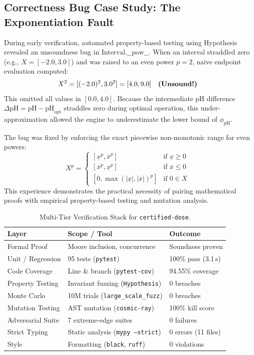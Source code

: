 \documentclass[10pt,twocolumn,letterpaper]{article}
\theoremstyle{definition}
\newcommand{\pHopt}{\text{pH}_{\text{opt}}}
\newcommand{\phipH}{\phi_{\text{pH}}}
\begin{document}
\subsection{Correctness Bug Case Study: The Exponentiation Fault}
During early verification, automated property-based testing using Hypothesis~\cite{maciver2019hypothesis} revealed an unsoundness bug in $\text{Interval}.\_\_\text{pow}\_\_$. When an interval straddled zero (e.g., $X = [-2.0, 3.0]$) and was raised to an even power $p=2$, naive endpoint evaluation computed:
\begin{equation}
X^2 = [(-2.0)^2, 3.0^2] = [4.0, 9.0] \quad \text{\textbf{(Unsound!)}}
\end{equation}
This omitted all values in $[0.0, 4.0]$. Because the intermediate pH difference $\Delta\text{pH} = \text{pH} - \pHopt$ straddles zero during optimal operation, this under-approximation allowed the engine to underestimate the lower bound of $\phipH$. 

The bug was fixed by enforcing the exact piecewise non-monotonic range for even powers:
\begin{equation}
X^p = \begin{cases}
[\underline{x}^p, \overline{x}^p] & \text{if } \underline{x} \ge 0 \\
[\overline{x}^p, \underline{x}^p] & \text{if } \overline{x} \le 0 \\
[0, \max(|\underline{x}|, |\overline{x}|)^p] & \text{if } 0 \in X
\end{cases}
\end{equation}
This experience demonstrates the practical necessity of pairing mathematical proofs with empirical property-based testing and mutation analysis.

\begin{table}[t]
\centering
\small
\caption{Multi-Tier Verification Stack for \texttt{certified-dose}.}
\label{tab:verification}
\begin{tabularx}{\columnwidth}{lXl}
\toprule
\textbf{Layer} & \textbf{Scope / Tool} & \textbf{Outcome} \\
\midrule
Formal Proof & Moore inclusion, concurrence & Soundness proven \\
Unit / Regression & 95 tests (\texttt{pytest}) & 100\% pass (3.1\,s) \\
Code Coverage & Line \& branch (\texttt{pytest-cov}) & 94.55\% coverage \\
Property Testing & Invariant fuzzing (\texttt{Hypothesis}) & 0 breaches \\
Monte Carlo & 10M trials (\texttt{large\_scale\_fuzz}) & 0 breaches \\
Mutation Testing & AST mutation (\texttt{cosmic-ray}) & 100\% kill score \\
Adversarial Suite & 7 extreme-edge suites & 0 failures \\
Strict Typing & Static analysis (\texttt{mypy --strict}) & 0 errors (11 files) \\
Style & Formatting (\texttt{black}, \texttt{ruff}) & 0 violations \\
\bottomrule
\end{tabularx}
\end{table}
\end{document}
